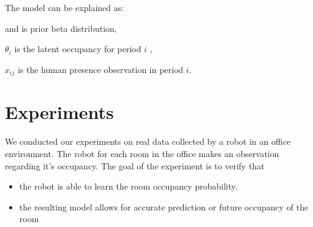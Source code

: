 The model can be explained as:

	\boldmath{$\alpha$} and \boldmath{$\beta$} is  prior beta distribution, 
	
	$\theta_i$ is the latent occupancy for period $i$  ,
	
	$x_{ij}$ is the human presence observation in period $i$.



\FloatBarrier
\section{Experiments}
We conducted our experiments on real data collected by a robot in an office environment. The robot for each room in the office makes an observation regarding it's occupancy. The goal of the experiment is to verify that
\begin{itemize}
    \item the robot is able to learn the room occupancy probability.
	\item the resulting model allows for accurate prediction or future occupancy of the room
\end{itemize}


